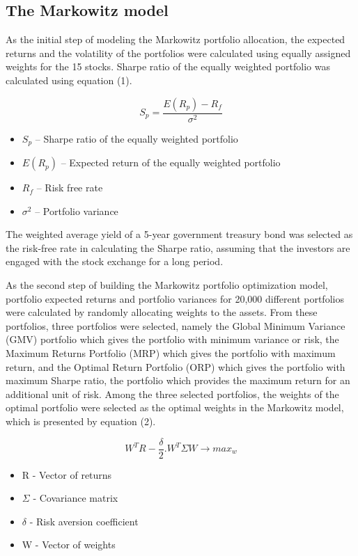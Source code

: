 \documentclass[conference]{IEEEtran}
\begin{document}
\subsection{The Markowitz model} 

As the initial step of modeling the Markowitz portfolio allocation, the expected returns and the volatility of the portfolios were calculated using equally assigned weights for the 15 stocks. Sharpe ratio of the equally weighted portfolio was calculated using equation (1). 

\begin{equation}
{S_p = \frac{E(R_p) - R_f}{\sigma^2}}
\end{equation}

\begin{itemize}
   \item $S_p$ – Sharpe ratio of the equally weighted portfolio
    \item $E(R_p)$ – Expected return of the equally weighted portfolio
    \item $R_f$ – Risk free rate 
    \item $\sigma^2$ – Portfolio variance 
\end{itemize}

The weighted average yield of a 5-year government treasury bond was selected as the risk-free rate in calculating the Sharpe ratio, assuming that the investors are engaged with the stock exchange for a long period.

As the second step of building the Markowitz portfolio optimization model, portfolio expected returns and portfolio variances for 20,000 different portfolios were calculated by randomly allocating weights to the assets. From these portfolios, three portfolios were selected, namely the Global Minimum Variance (GMV) portfolio which gives the portfolio with minimum variance or risk, the Maximum Returns Portfolio (MRP) which gives the portfolio with maximum return, and the Optimal Return Portfolio (ORP) which gives the portfolio with maximum Sharpe ratio, the portfolio which provides the maximum return for an additional unit of risk. Among the three selected portfolios, the weights of the optimal portfolio were selected as the optimal weights in the Markowitz model, which is presented by equation (2).

\begin{equation}
{W^TR - \frac{\delta}{2}.W^T\Sigma W \rightarrow max_w}
\end{equation} 

\begin{itemize}
\item R - Vector of returns
\item $\Sigma$ - Covariance matrix
\item $\delta$ - Risk aversion coefficient
\item W - Vector of weights
\end{itemize} \vspace{0.1cm}
\end{document}
